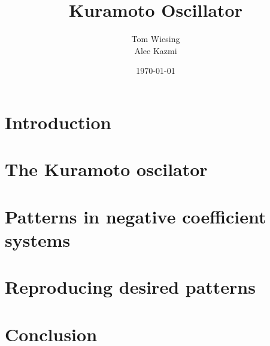 \documentclass[12pt]{article}
\title{Kuramoto Oscillator}
\author{Tom Wiesing \\ Alee Kazmi}
\date{\today}
\begin{document}
	
	\maketitle
	\newpage
	
	\tableofcontents
	\newpage
	
	\section{Introduction}
	
	
	\section{The Kuramoto oscilator}
	
	
	\section{Patterns in negative coefficient systems}
	
	
	\section{Reproducing desired patterns}
	
	
	\section{Conclusion}
	
	
\end{document}
